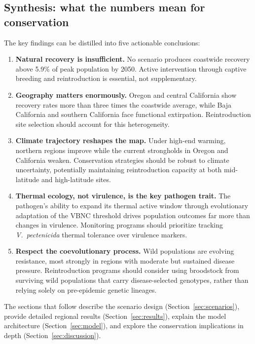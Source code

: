 \subsection{Synthesis: what the numbers mean for conservation}
\label{sec:findings_synthesis}

The key findings can be distilled into five actionable conclusions:

\begin{enumerate}
    \item \textbf{Natural recovery is insufficient.} No scenario produces
    coastwide recovery above 5.9\% of peak population by 2050. Active
    intervention through captive breeding and reintroduction
    \citep{hodin2021} is essential, not supplementary.

    \item \textbf{Geography matters enormously.} Oregon and central
    California show recovery rates more than three times the coastwide
    average, while Baja California and southern California face functional
    extirpation. Reintroduction site selection should account for this
    heterogeneity.

    \item \textbf{Climate trajectory reshapes the map.} Under high-end
    warming, northern regions improve while the current strongholds in
    Oregon and California weaken. Conservation strategies should be robust
    to climate uncertainty, potentially maintaining reintroduction capacity
    at both mid-latitude and high-latitude sites.

    \item \textbf{Thermal ecology, not virulence, is the key pathogen
    trait.} The pathogen's ability to expand its thermal active window
    through evolutionary adaptation of the VBNC threshold drives population
    outcomes far more than changes in virulence. Monitoring programs should
    prioritize tracking \textit{V.\ pectenicida} thermal tolerance over
    virulence markers.

    \item \textbf{Respect the coevolutionary process.} Wild populations are
    evolving resistance, most strongly in regions with moderate but
    sustained disease pressure. Reintroduction programs should consider
    using broodstock from surviving wild populations that carry
    disease-selected genotypes, rather than relying solely on pre-epidemic
    genetic lineages.
\end{enumerate}

The sections that follow describe the scenario design (Section~\ref{sec:scenarios}), provide detailed regional results (Section~\ref{sec:results}), explain the model architecture (Section~\ref{sec:model}), and explore the conservation implications in depth (Section~\ref{sec:discussion}).